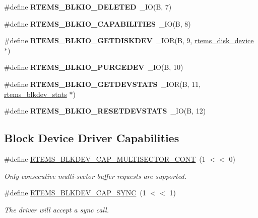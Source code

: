 \begin{DoxyCompactItemize}
\#define {\bfseries R\+T\+E\+M\+S\+\_\+\+B\+L\+K\+I\+O\+\_\+\+D\+E\+L\+E\+T\+ED}~\+\_\+\+IO(\textquotesingle{}B\textquotesingle{}, 7)
\item 
\mbox{\label{group__rtems__blkdev_gaf221d1d0367d25bf1e4996b4080ccb0c}} 
\#define {\bfseries R\+T\+E\+M\+S\+\_\+\+B\+L\+K\+I\+O\+\_\+\+C\+A\+P\+A\+B\+I\+L\+I\+T\+I\+ES}~\+\_\+\+IO(\textquotesingle{}B\textquotesingle{}, 8)
\item 
\mbox{\label{group__rtems__blkdev_ga1d4cf51d33c09890769c90a4966dd62a}} 
\#define {\bfseries R\+T\+E\+M\+S\+\_\+\+B\+L\+K\+I\+O\+\_\+\+G\+E\+T\+D\+I\+S\+K\+D\+EV}~\+\_\+\+I\+OR(\textquotesingle{}B\textquotesingle{}, 9, \mbox{\hyperlink{structrtems__disk__device}{rtems\+\_\+disk\+\_\+device}} $\ast$)
\item 
\mbox{\label{group__rtems__blkdev_ga93fc9d74a35bcddfb7f039e49fa33b5e}} 
\#define {\bfseries R\+T\+E\+M\+S\+\_\+\+B\+L\+K\+I\+O\+\_\+\+P\+U\+R\+G\+E\+D\+EV}~\+\_\+\+IO(\textquotesingle{}B\textquotesingle{}, 10)
\item 
\mbox{\label{group__rtems__blkdev_gaf958bca8306abeeb0395040dc7712df2}} 
\#define {\bfseries R\+T\+E\+M\+S\+\_\+\+B\+L\+K\+I\+O\+\_\+\+G\+E\+T\+D\+E\+V\+S\+T\+A\+TS}~\+\_\+\+I\+OR(\textquotesingle{}B\textquotesingle{}, 11, \mbox{\hyperlink{structrtems__blkdev__stats}{rtems\+\_\+blkdev\+\_\+stats}} $\ast$)
\item 
\mbox{\label{group__rtems__blkdev_ga257b1b95cc4b0ef5fe87cf7beb6ec4ac}} 
\#define {\bfseries R\+T\+E\+M\+S\+\_\+\+B\+L\+K\+I\+O\+\_\+\+R\+E\+S\+E\+T\+D\+E\+V\+S\+T\+A\+TS}~\+\_\+\+IO(\textquotesingle{}B\textquotesingle{}, 12)
\end{DoxyCompactItemize}
\subsection*{Block Device Driver Capabilities}
\begin{DoxyCompactItemize}
\item 
\#define \mbox{\hyperlink{group__rtems__blkdev_ga25f2de1a9746d8b7d016ae12c51d5328}{R\+T\+E\+M\+S\+\_\+\+B\+L\+K\+D\+E\+V\+\_\+\+C\+A\+P\+\_\+\+M\+U\+L\+T\+I\+S\+E\+C\+T\+O\+R\+\_\+\+C\+O\+NT}}~(1 $<$$<$ 0)
\begin{DoxyCompactList}\small\item\em Only consecutive multi-\/sector buffer requests are supported. \end{DoxyCompactList}\item 
\#define \mbox{\hyperlink{group__rtems__blkdev_gab3164c0a50bb161d4a99177e1f08ef52}{R\+T\+E\+M\+S\+\_\+\+B\+L\+K\+D\+E\+V\+\_\+\+C\+A\+P\+\_\+\+S\+Y\+NC}}~(1 $<$$<$ 1)
\begin{DoxyCompactList}\small\item\em The driver will accept a sync call. \end{DoxyCompactList}\end{DoxyCompactItemize}



